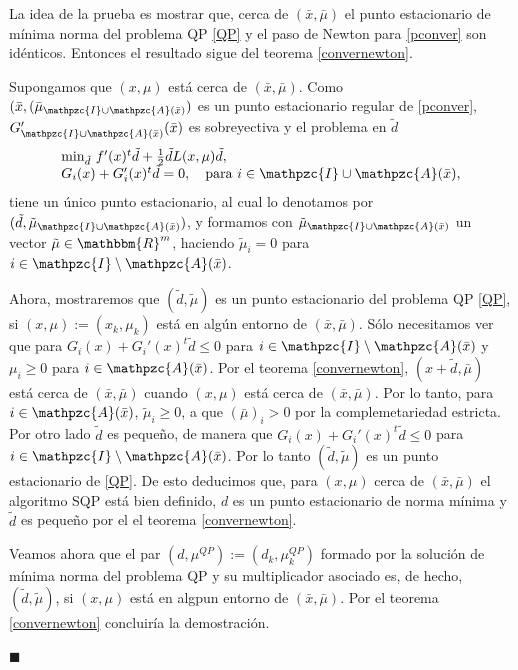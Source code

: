 \documentclass[a4paper,10pt]{book}
\newcommand{\R}{\mathbbm{R}}
\newcommand{\bx}{\bar{x}}
\newcommand{\bmu}{\bar{\mu}}
\newcommand{\cI}{\mathpzc{I}}
\newcommand{\cA}{\mathpzc{A}}
\newenvironment{dem}{\vspace*{-0.1cm}{\it Demostraci\'on:}}{\hfill
$\blacksquare$\\}
\begin{document}
\begin{dem}
La idea de la prueba es mostrar que, cerca de $(\bx,\bmu)$ el punto estacionario de mínima norma del problema QP \eqref{QP} y el paso de Newton para \eqref{pconver} son idénticos. Entonces el resultado sigue del teorema \eqref{convernewton}.

Supongamos que $(x,\mu)$ está cerca de $(\bx,\bmu)$. Como $(\bx,(\bmu_{\cI\cup\cA(\bx)})$ es un punto estacionario regular de \eqref{pconver}, $G'_{\cI\cup\cA(\bx)}(\bx)$ es sobreyectiva y el problema en $\tilde{d}$
\begin{equation}\label{qpdemteor}
    \begin{array}{l}
    \mathrm{min}_{\tilde{d}}\ f'(x)^t\tilde{d}+\frac{1}{2}\tilde{d}L(x,\mu)\tilde{d},\\
    G_i(x)+G_i'(x)^t\tilde{d}=0,\quad \mbox{para }i\in\cI\cup\cA(\bx),
    \end{array}
\end{equation}
tiene un único punto estacionario, al cual lo denotamos por $(\tilde{d},\tilde{\mu}_{\cI\cup\cA(\bx)})$, y formamos con $\tilde{\mu}_{\cI\cup\cA(\bx)}$ un vector $\tilde{\mu}\in\R^m$, haciendo $\tilde{\mu}_i=0$ para $i\in\cI\setminus\cA(\bx)$.

Ahora, mostraremos que $(\tilde{d},\tilde{\mu})$ es un punto estacionario del problema QP \eqref{QP}, si $(x,\mu):=(x_k,\mu_k)$ está en algún entorno de $(\bx,\bmu)$. Sólo necesitamos ver que para $G_i(x)+G_i'(x)^t\tilde{d}\leq0$ para $i\in\cI\setminus\cA(\bx)$ y $\mu_i\geq0$ para $i\in\cA(\bx)$. Por el teorema \eqref{convernewton}, $(x+\tilde{d},\bmu)$ está cerca de $(\bx,\bmu)$ cuando $(x,\mu)$ está cerca de $(\bx,\bmu)$. Por lo tanto, para $i\in\cA(\bx)$, $\tilde{\mu}_i\geq0$, a que $(\bmu)_i>0$ por la complemetariedad estricta. Por otro lado $\tilde{d}$ es pequeño, de manera que $G_i(x)+G_i'(x)^t\tilde{d}\leq0$ para $i\in\cI\setminus\cA(\bx)$. Por lo tanto $(\tilde{d},\tilde{\mu})$ es un punto estacionario de \eqref{QP}. De esto deducimos que, para $(x,\mu)$ cerca de $(\bx,\bmu)$ el algoritmo SQP está bien definido, $d$ es un punto estacionario de norma mínima y $\tilde{d}$ es pequeño por el el teorema \eqref{convernewton}.

Veamos ahora que el par $(d,\mu^{QP}):=(d_k,\mu^{QP}_k)$ formado por la solución de mínima norma del problema QP y su multiplicador asociado es, de hecho, $(\tilde{d},\tilde{\mu})$, si $(x,\mu)$ está en algpun entorno de $(\bx,\bmu)$. Por el teorema \eqref{convernewton} concluiría la demostración. 


\end{dem}
\end{document}
